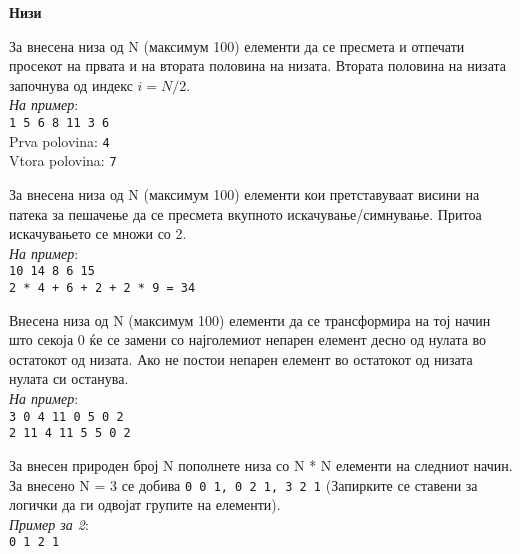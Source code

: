 \documentclass[12pt,a4paper]{exam}
\begin{document}
\pagestyle{headandfoot}
\headrule
{}
\begin{center}
\Large{\textbf{Низи}}
\end{center}
\begin{questions}

\question
За внесена низа од N (максимум 100) елементи да се пресмета  и отпечати
просекот на првата и на втората половина на низата. Втората половина на низата
започнува од индекс $i = N / 2$.
\\\emph{На пример}:\\
\texttt{1 5 6 8 11 3 6}\\ 
Prva polovina: \texttt{4}\\
Vtora polovina: \texttt{7}

\question
За внесена низа од N (максимум 100) елементи кои претставуваат висини на патека
за пешачење да се пресмета вкупното искачување/симнување. Притоа искачувањето се
множи со 2. 
\\\emph{На пример}:\\
\texttt{10 14 8 6 15}\\
\texttt{2 * 4 + 6 + 2 + 2 * 9 = 34}

\question
Внесена низа од N (максимум 100) елементи да се трансформира на тој начин што
секоја 0 ќе се замени со најголемиот непарен елемент десно од нулата во
остатокот од низата. Ако не постои непарен елемент во остатокот од низата нулата
си останува.\\\emph{На пример}:\\
\texttt{3 0 4 11 0 5 0 2}\\
\texttt{2 11 4 11 5 5 0 2}

\question
За внесен природен број N пополнете низа со N * N елементи на следниот начин. За
внесено N = 3 се добива \texttt{0 0 1, 0 2 1, 3 2 1} (Запирките се ставени за
логички да ги одвојат групите на елементи). \\\emph{Пример за 2}:\\
\texttt{0 1 2 1}

\end{questions}
\end{document}
